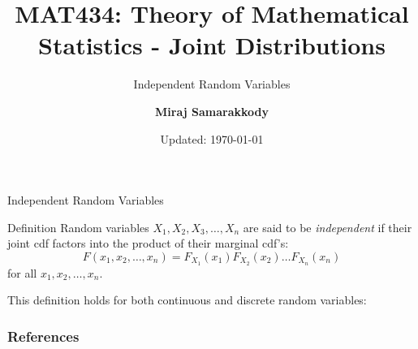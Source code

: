 \documentclass{beamer}
\title{MAT434: Theory of Mathematical Statistics - Joint Distributions}
\subtitle{Independent Random Variables \cite{RJA2006}}
\author{\textbf{Miraj Samarakkody}}
\institute{Tougaloo College}
\date{Updated: \today}
\begin{document}
\begin{frame}
    \titlepage
\end{frame}




\begin{frame}{Independent Random Variables}
    \begin{block}{Definition}
        Random variables \(X_1,X_2, X_3, \dots, X_n\) are said to be \textit{independent} if their joint cdf factors into the product of their marginal cdf's:
        \[F(x_1, x_2, \dots, x_n)= F_{X_1}(x_1)F_{X_2}(x_2)\dots F_{X_n}(x_n)\] for all \(x_1, x_2, \dots, x_n\). 
    \end{block}

    This definition holds for both continuous and discrete random variables:
\end{frame}

\begin{frame}
    \frametitle{References}
\end{frame}
\end{document}
